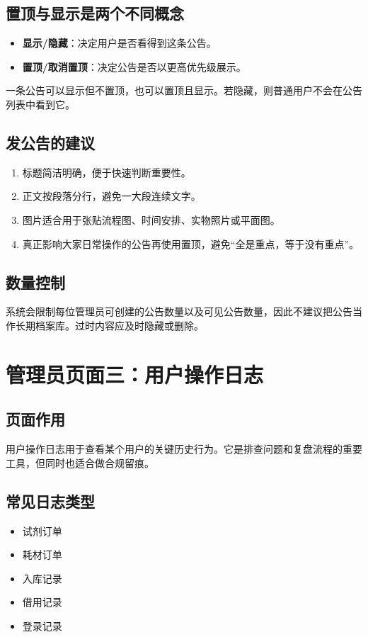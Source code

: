 \documentclass[12pt,a4paper]{ctexart}
\begin{document}
\subsection{置顶与显示是两个不同概念}
\begin{itemize}
  \item \textbf{显示/隐藏}：决定用户是否看得到这条公告。
  \item \textbf{置顶/取消置顶}：决定公告是否以更高优先级展示。
\end{itemize}

一条公告可以显示但不置顶，也可以置顶且显示。若隐藏，则普通用户不会在公告列表中看到它。

\subsection{发公告的建议}
\begin{enumerate}
  \item 标题简洁明确，便于快速判断重要性。
  \item 正文按段落分行，避免一大段连续文字。
  \item 图片适合用于张贴流程图、时间安排、实物照片或平面图。
  \item 真正影响大家日常操作的公告再使用置顶，避免“全是重点，等于没有重点”。
\end{enumerate}

\subsection{数量控制}
系统会限制每位管理员可创建的公告数量以及可见公告数量，因此不建议把公告当作长期档案库。过时内容应及时隐藏或删除。

\newpage
\section{管理员页面三：用户操作日志}

\subsection{页面作用}
用户操作日志用于查看某个用户的关键历史行为。它是排查问题和复盘流程的重要工具，但同时也适合做合规留痕。

\subsection{常见日志类型}
\begin{itemize}
  \item 试剂订单
  \item 耗材订单
  \item 入库记录
  \item 借用记录
  \item 登录记录
\end{itemize}
\end{document}
